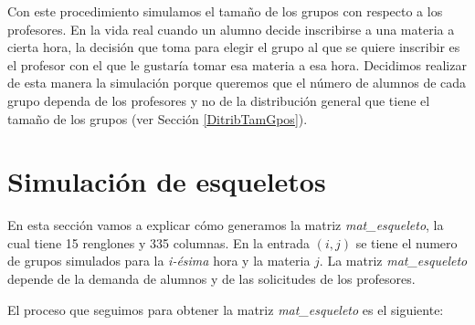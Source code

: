 Con este procedimiento simulamos el tamaño de los grupos con respecto a los profesores. En la vida real cuando un alumno decide inscribirse a una materia a cierta hora, la decisión que toma para elegir el grupo al que se quiere inscribir es el profesor con el que le gustaría tomar esa materia a esa hora. Decidimos realizar de esta manera la simulación porque queremos que el número de alumnos de cada grupo dependa de los profesores y no de la distribución general que tiene el tamaño de los grupos (ver Sección \ref{DitribTamGpos}).





\section{Simulación de esqueletos}

En esta sección vamos a explicar cómo generamos la matriz \textit{mat\_esqueleto}, la cual tiene 15 renglones y 335 columnas. En la entrada $(i,j)$ se tiene el numero de grupos simulados para la \textit{i-ésima} hora y la materia $j$. La matriz \textit{mat\_esqueleto} depende de la demanda de alumnos y de las solicitudes de los profesores.

El proceso que seguimos para obtener la matriz \textit{mat\_esqueleto} es el siguiente:

